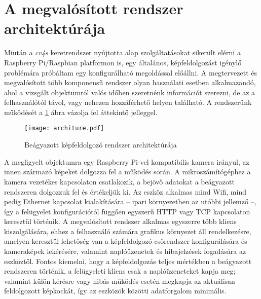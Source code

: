 \section{A megvalósított rendszer architektúrája} \label{architektura}

Miután a \emph{cv4s} keretrendszer nyújtotta alap szolgáltatásokat sikerült elérni a Raspberry Pi/Raspbian platformon is, egy általános, képfeldolgozást igénylő problémára próbáltam egy konfigurálható megoldással előállni. A megtervezett és megvalósított több komponensű rendszer olyan használati esetben alkalmazandó, ahol a vizsgált objektumról valós időben szeretnénk információt szerezni, de az a felhasználótól távol, vagy nehezen hozzáférhető helyen található. A rendszerünk működését a \ref{fig:placeholder_2} ábra vázolja fel áttekintő jelleggel.

\begin{figure}[h]
\texttt{[image: architure.pdf]}
\centering
\caption{Beágyazott képfeldolgozó rendszer architektúrája}
\label{fig:placeholder_2}
\end{figure}

A megfigyelt objektumra egy Raspberry Pi-vel kompatibilis kamera irányul, az innen származó képeket dolgozza fel a működés során. A mikroszámítógéphez a kamera vezetékes kapcsolaton csatlakozik, a bejövő adatokat a beágyazott rendszeren dolgozzuk fel és értékeljük ki. Az eszköz alkalmas mind Wifi, mind pedig Ethernet kapcsolat kialakítására -- ipari környezetben az utóbbi jellemző --, így a felügyelet konfigurációtól függően egyszerű HTTP vagy TCP kapcsolaton keresztül történik. A megvalósított rendszer alkalmas egyszerre több kliens kiszolgálására, ehhez a felhasználó számára grafikus környezet áll rendelkezésre, amelyen keresztül lehetőség van a képfeldolgozó csőrendszer konfigurálására és kameraképek lekérésére, valamint naplóüzenetek és hibajelzések fogadására az eszköztől. Fontos kiemelni, hogy a képfeldolgozás teljes mértékben a beágyazott rendszeren történik, a felügyeleti kliens csak a naplóüzeneteket kapja meg; valamint külön kérésre vagy hibás működés esetén megkapja az aktuálisan feldolgozott képkockát, így az eszközök közötti adatforgalom minimális.
